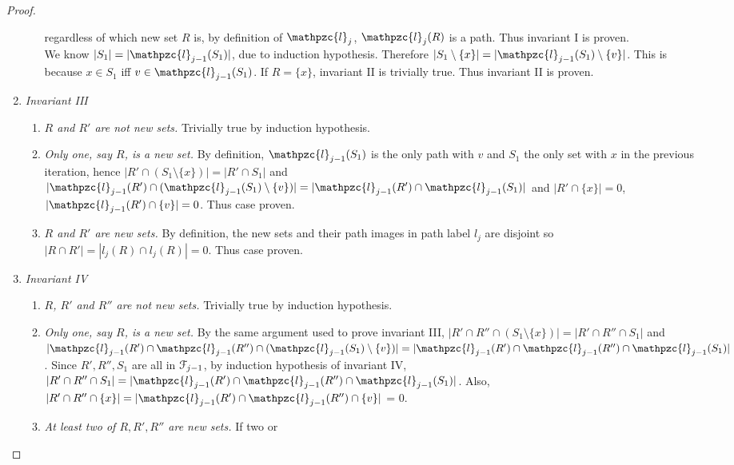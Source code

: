 \documentclass[a4paper,UKenglish,numberwithinsect]{lipics} %
\def\cF{{\cal F}}
\def\cl{\mathpzc{l}}
\begin{document}
\begin{proof}
\begin{enumerate}[{Case }1:]
\begin{enumerate}[{Case 1.}1:]
      regardless of which new set $R$ is, by definition of
      $\cl_j$, $\cl_{j}(R)$ is a path. Thus invariant I is proven.\\
      We know $|S_1| = |\cl_{j-1}(S_1)|$, due to induction
      hypothesis. Therefore $|S_1 \setminus \{x\}| = |\cl_{j-1}(S_1)
      \setminus \{v\}|$. This is because $x \in S_1$ iff $v \in
      \cl_{j-1}(S_1)$. If $R = \{x\}$, invariant II is trivially
      true. Thus invariant II is proven.
    \end{enumerate}
  \item {\em Invariant III}
    \begin{enumerate} [{Case 2.}1:]
    \item {\em $R$ and $R'$ are not new sets.} Trivially true by
      induction hypothesis.
    \item {\em Only one, say $R$, is a new set.}  By definition,
      $\cl_{j-1}(S_1)$ is the only path with $v$ and $S_1$ the only
      set with $x$ in the previous iteration, hence $|R' \cap (S_1
      \setminus \{x\})| = |R' \cap S_1|$ and $|\cl_{j-1}(R') \cap
      (\cl_{j-1}(S_1) \setminus \{v\})| = |\cl_{j-1}(R') \cap
      \cl_{j-1}(S_1)|$ and $|R' \cap \{x\}| = 0$, $|\cl_{j-1}(R') \cap
      \{v\}| = 0$. Thus case proven.
    \item {\em $R$ and $R'$ are new sets.} By definition, the new sets
      and their path images in path label $l_j$ are disjoint so $|R
      \cap R'| = |l_j(R) \cap l_j(R)| = 0$. Thus case proven.
    \end{enumerate}
  \item {\em Invariant IV}
    \begin{enumerate}[{Case 3.}1:]
    \item {\em $R$, $R'$ and $R''$ are not new sets.} Trivially true
      by induction hypothesis.
    \item {\em Only one, say $R$, is a new set.}  By the same argument
      used to prove invariant III, $|R' \cap R'' \cap (S_1 \setminus
      \{x\})| = |R' \cap R'' \cap S_1|$ and $|\cl_{j-1}(R') \cap
      \cl_{j-1}(R'') \cap (\cl_{j-1}(S_1) \setminus \{v\})| =
      |\cl_{j-1}(R') \cap \cl_{j-1}(R'') \cap \cl_{j-1}(S_1)|$. Since
      $R', R'', S_1$ are all in $\cF_{j-1}$, by induction hypothesis
      of invariant IV, $|R' \cap R'' \cap S_1| = |\cl_{j-1}(R') \cap
      \cl_{j-1}(R'') \cap \cl_{j-1}(S_1)|$.  Also, $|R' \cap R'' \cap
      \{x\}| = |\cl_{j-1}(R') \cap \cl_{j-1}(R'') \cap \{v\}|$ = 0.
    \item {\em At least two of $R, R', R''$ are new sets.}  If two or

\end{enumerate}
\end{enumerate}
\end{proof}
\end{document}
